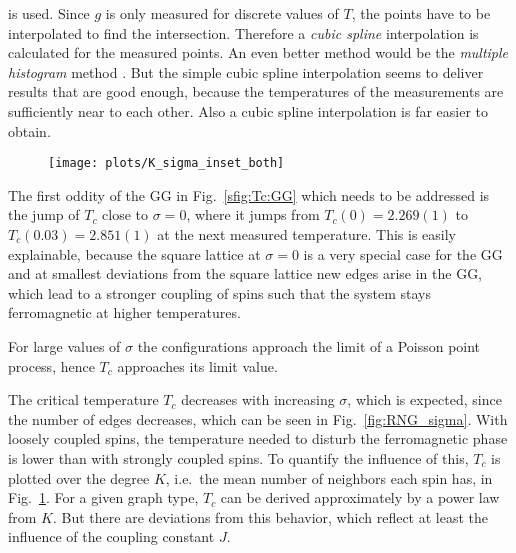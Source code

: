 is used.
Since \(g\) is only measured for discrete values of \(T\),
the points have to be interpolated to find the intersection. Therefore
a \emph{cubic spline} \cite{press2007numerical} interpolation %
is calculated for the measured points.
An even better method would be the
\emph{multiple histogram} method \cite[p. 219ff]{NewmanBarkema1999}.
But the simple cubic spline interpolation seems to deliver results that
are good enough, because the temperatures of the measurements are
sufficiently near to each other. Also a cubic spline interpolation is
far easier to obtain.

\begin{figure}[hbtp]
\label{fig:TcK}
        \texttt{[image: plots/K\_sigma\_inset\_both]}
\end{figure}
The first oddity of the GG in Fig.~\ref{sfig:Tc:GG} which needs to be addressed is
the jump of $T_c$ close to $\sigma = 0$, where it jumps from $T_c(0) = 2.269(1)$
to $T_c(0.03) = 2.851(1)$ at the next measured temperature. This is easily explainable,
because the square lattice at $\sigma = 0$ is a very special case for the
GG and at smallest deviations from the square lattice new edges arise in
the GG, which lead to a stronger coupling of spins such that the system stays
ferromagnetic at higher temperatures.

For large values of $\sigma$ the configurations approach the limit of a
Poisson point process, hence $T_c$ approaches its limit value.

The critical temperature $T_c$ decreases with increasing $\sigma$, which
is expected, since the number of edges decreases, which can be seen in
Fig.~\ref{fig:RNG_sigma}. With loosely coupled spins, the temperature
needed to disturb the ferromagnetic phase is lower than with strongly coupled
spins. To quantify the influence of this, $T_c$ is plotted over the
degree $K$, i.e.~the mean number of neighbors each spin has, in Fig.~\ref{fig:TcK}.
For a given graph type, $T_c$ can be derived approximately by a power law
from $K$. But there are deviations from this behavior, which reflect
at least the influence of the coupling constant $J$.
